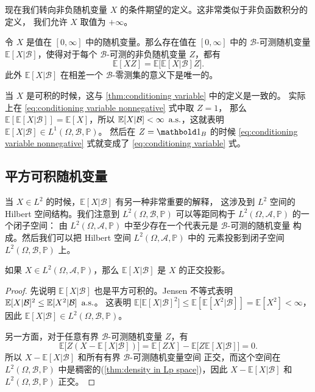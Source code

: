 现在我们转向非负随机变量 $X$ 的条件期望的定义。这非常类似于非负函数积分的定义，
我们允许 $X$ 取值为 $+\infty$。

\begin{theorem}\label{thm:conditioning variable nonnegative}
  令 $X$ 是值在 $[0,\infty]$ 中的随机变量。那么存在值在 $[0,\infty]$
  中的 $\mathcal{B}$-可测随机变量 $\mathbb{E}[X|\mathcal{B}]$，使得对于每个
  $\mathcal{B}$-可测的非负随机变量 $Z$，都有
  \begin{equation}\label{eq:conditioning variable nonnegative}
    \mathbb{E}[XZ]=\mathbb{E}\bigl[\mathbb{E}[X|\mathcal{B}]Z\bigr]  .
  \end{equation} 
  此外 $\mathbb{E}[X|\mathcal{B}]$ 在相差一个 $\mathcal{B}$-零测集的意义下是唯一的。
\end{theorem}

当 $X$ 是可积的时候，这与 \autoref{thm:conditioning variable} 中的定义是一致的。
实际上在 \eqref{eq:conditioning variable nonnegative} 式中取 $Z=1$，
那么 $\mathbb{E}[\mathbb{E}[X|\mathcal{B}]]=\mathbb{E}[X]$，所以
$\mathbb{E}[X|\mathcal{B}]<\infty \, \text{$$ a.s.}$，这就表明 $\mathbb{E}[X|\mathcal{B}]\in L^1(\Omega,\mathcal{B},\mathbb{P})$。
然后在 $Z=\idf_B$ 的时候 \eqref{eq:conditioning variable nonnegative} 式就变成了
\eqref{eq:conditioning variable} 式。

\subsection{平方可积随机变量}

当 $X\in L^2$ 的时候，$\mathbb{E}[X|\mathcal{B}]$ 有另一种非常重要的解释，
这涉及到 $L^2$ 空间的 Hilbert 空间结构。我们注意到 $L^2(\Omega,\mathcal{B},\mathbb{P})$
可以等距同构于 $L^2(\Omega,\mathcal{A},\mathbb{P})$ 的一个闭子空间：
由 $L^2(\Omega,\mathcal{A},\mathbb{P})$ 中至少存在一个代表元是 $\mathcal{B}$-可测的随机变量
构成。然后我们可以把 Hilbert 空间 $L^2(\Omega,\mathcal{A},\mathbb{P})$ 中的
元素投影到闭子空间 $L^2(\Omega,\mathcal{B},\mathbb{P})$ 上。

\begin{theorem}
  如果 $X\in L^2(\Omega,\mathcal{A},\mathbb{P})$，那么 $\mathbb{E}[X|\mathcal{B}]$
  是 $X$ 的正交投影。
\end{theorem}
\begin{proof}
  先说明 $\mathbb{E}[X|\mathcal{B}]$ 也是平方可积的。Jensen 不等式表明 $\mathbb{E}[X|\mathcal{B}]^2\leq \mathbb{E}[X^2|\mathcal{B}]\, \text{$$ a.s.}$。
  这表明 $\mathbb{E}\bigl[\mathbb{E}[X|\mathcal{B}]^2\bigr]\leq \mathbb{E}[\mathbb{E}[X^2|\mathcal{B}]]=\mathbb{E}[X^2]<\infty$，
  因此 $\mathbb{E}[X|\mathcal{B}]\in L^2(\Omega,\mathcal{B},\mathbb{P})$。

  另一方面，对于任意有界 $\mathcal{B}$-可测随机变量 $Z$，有
  \[
    \mathbb{E}\bigl[
      Z(X-\mathbb{E}[X|\mathcal{B}])
    \bigr]=\mathbb{E}[ZX]-\mathbb{E}\bigl[
      Z\mathbb{E}[X|\mathcal{B}]
    \bigr]=0.
  \]
  所以 $X-\mathbb{E}[X|\mathcal{B}]$ 和所有有界 $\mathcal{B}$-可测随机变量空间
  正交，而这个空间在 $L^2(\Omega,\mathcal{B},\mathbb{P})$ 中是稠密的(\autoref{thm:density in Lp space})，因此
  $X-\mathbb{E}[X|\mathcal{B}]$ 和 $L^2(\Omega,\mathcal{B},\mathbb{P})$ 正交。
\end{proof}

